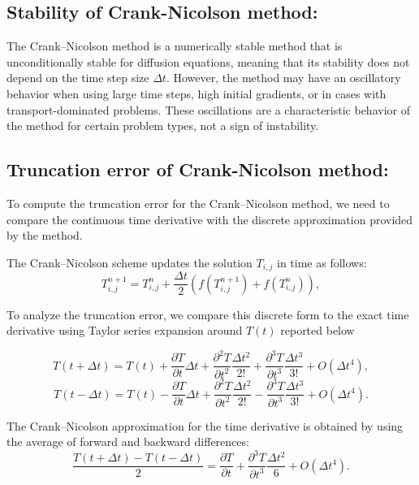 \documentclass{article}
\begin{document}
\subsection*{Stability of Crank-Nicolson method:}

The Crank–Nicolson method is a numerically stable method that is unconditionally stable for diffusion equations, meaning that its stability does not depend on the time step size $\Delta t $. However, the method may have an oscillatory behavior when using large time steps, high initial gradients, or in cases with transport-dominated problems. These oscillations are a characteristic behavior of the method for certain problem types, not a sign of instability.

\subsection*{Truncation error of Crank-Nicolson method:}

To compute the truncation error for the Crank–Nicolson method, we need to compare the continuous time derivative with the discrete approximation provided by the method.

The Crank–Nicolson scheme updates the solution \( T_{i,j} \) in time as follows:
\begin{equation}
T_{i,j}^{n+1} = T_{i,j}^n + \frac{\Delta t}{2} \left( f(T_{i,j}^{n+1}) + f(T_{i,j}^n) \right),
\end{equation}

To analyze the truncation error, we compare this discrete form to the exact time derivative using Taylor series expansion around \( T(t) \) reported below

\begin{equation*}
T(t + \Delta t) = T(t) + \frac{\partial T}{\partial t} \Delta t + \frac{\partial^2 T}{\partial t^2} \frac{\Delta t^2}{2!} + \frac{\partial^3 T}{\partial t^3} \frac{\Delta t^3}{3!} + O(\Delta t^4),
\end{equation*}
\begin{equation*}
T(t - \Delta t) = T(t) - \frac{\partial T}{\partial t} \Delta t + \frac{\partial^2 T}{\partial t^2} \frac{\Delta t^2}{2!} - \frac{\partial^3 T}{\partial t^3} \frac{\Delta t^3}{3!} + O(\Delta t^4).
\end{equation*}

The Crank–Nicolson approximation for the time derivative is obtained by using the average of forward and backward differences:
\begin{equation*}
\frac{T(t + \Delta t) - T(t - \Delta t)}{2} = \frac{\partial T}{\partial t} + \frac{\partial^3 T}{\partial t^3} \frac{\Delta t^2}{6} + O(\Delta t^4).
\end{equation*}
\end{document}
